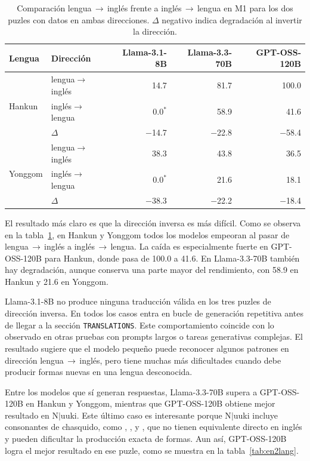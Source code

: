 \begin{table}[H]
	\centering
	\caption{Comparación lengua\,$\rightarrow$\,inglés frente a inglés\,$\rightarrow$\,lengua en M1 para los dos puzles con datos en ambas direcciones. $\Delta$ negativo indica degradación al invertir la dirección.}
	\label{tab:en2lang_delta}
	{\fontsize{10.5pt}{12pt}\selectfont
		\begin{tabular*}{0.95\textwidth}{@{\extracolsep{\fill}} llrrr}
			\toprule
			\textbf{Lengua} & \textbf{Dirección}
			& \textbf{Llama-3.1-8B} & \textbf{Llama-3.3-70B} & \textbf{GPT-OSS-120B} \\
			\midrule
			\multirow{3}{*}{Hankun}
			& lengua$\rightarrow$inglés   & 14.7 & 81.7 & 100.0 \\
			& inglés$\rightarrow$lengua   & $0.0^*$ & 58.9 & 41.6 \\
			& $\Delta$                    & $-$14.7 & $-$22.8 & $-$58.4 \\
			\midrule
			\multirow{3}{*}{Yonggom}
			& lengua$\rightarrow$inglés   & 38.3 & 43.8 & 36.5 \\
			& inglés$\rightarrow$lengua   & $0.0^*$ & 21.6 & 18.1 \\
			& $\Delta$                    & $-$38.3 & $-$22.2 & $-$18.4 \\
			\bottomrule
		\end{tabular*}
	}
\end{table}

El resultado más claro es que la dirección inversa es más difícil. Como se observa en la tabla~\ref{tab:en2lang_delta}, en Hankun y Yonggom todos los modelos empeoran al pasar de lengua\,$\rightarrow$\,inglés a inglés\,$\rightarrow$\,lengua. La caída es especialmente fuerte en GPT-OSS-120B para Hankun, donde pasa de 100.0 a 41.6. En Llama-3.3-70B también hay degradación, aunque conserva una parte mayor del rendimiento, con 58.9 en Hankun y 21.6 en Yonggom.

Llama-3.1-8B no produce ninguna traducción válida en los tres puzles de dirección inversa. En todos los casos entra en bucle de generación repetitiva antes de llegar a la sección \texttt{TRANSLATIONS}. Este comportamiento coincide con lo observado en otras pruebas con prompts largos o tareas generativas complejas. El resultado sugiere que el modelo pequeño puede reconocer algunos patrones en dirección lengua\,$\rightarrow$\,inglés, pero tiene muchas más dificultades cuando debe producir formas nuevas en una lengua desconocida.

Entre los modelos que sí generan respuestas, Llama-3.3-70B supera a GPT-OSS-120B en Hankun y Yonggom, mientras que GPT-OSS-120B obtiene mejor resultado en N$|$uuki. Este último caso es interesante porque N$|$uuki incluye consonantes de chasquido, como , , \ipainline{!} y , que no tienen equivalente directo en inglés y pueden dificultar la producción exacta de formas. Aun así, GPT-OSS-120B logra el mejor resultado en ese puzle, como se muestra en la tabla~\ref{tab:en2lang}.

